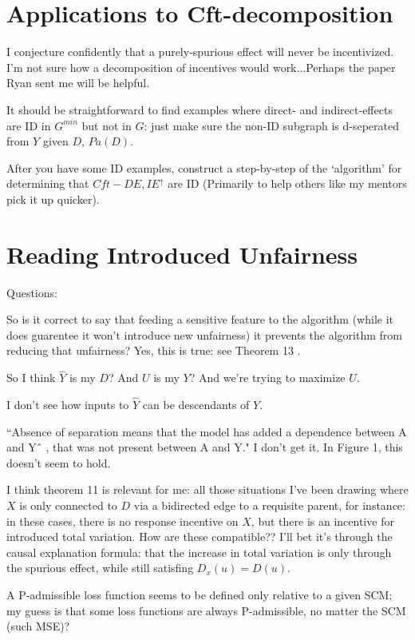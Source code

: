 \documentclass[letterpaper,10pt]{article}
\begin{document}
\section{Applications to Cft-decomposition}
I conjecture confidently that a purely-spurious effect will never be incentivized.
I'm not sure how a decomposition of incentives would work...Perhaps the paper Ryan sent me will be helpful.

It should be straightforward to find examples where direct- and indirect-effects are ID in $G^{min}$ but not in $G$: just make sure the non-ID subgraph is d-seperated from $Y$ given $D$, $Pa(D)$.

After you have some ID examples, construct a step-by-step of the `algorithm' for determining that $Cft-DE,IE^{\uparrow}$ are ID (Primarily to help others like my mentors pick it up quicker).


\section{Reading Introduced Unfairness}
Questions:

So is it correct to say that feeding a sensitive feature to the algorithm (while it does guarentee it won't introduce new unfairness) it prevents the algorithm from reducing that unfairness? 
\color{blue} Yes, this is true: see Theorem 13 \color{black}.

So I think $\hat{Y}$ is my $D$? And $U$ is my $Y$? And we're trying to maximize $U$.

I don't see how inputs to $\hat{Y}$ can be descendants of $Y$.

``Absence of separation means that the model has added a dependence between A and Yˆ , that was not present between A and Y." I don't get it. In Figure 1, this doesn't seem to hold.

I think theorem 11 is relevant for me: all those situations I've been drawing where $X$ is only connected to $D$ via a bidirected edge to a requisite parent, for instance: in these cases, there is no response incentive on $X$, but there is an incentive for introduced total variation.
How are these compatible?? 
I'll bet it's through the causal explanation formula: that the increase in total variation is only through the spurious effect, while still satisfing $D_x(u)=D(u)$.

A P-admissible loss function seems to be defined only relative to a given SCM; my guess is that some loss functions are always P-admissible, no matter the SCM (such MSE)?
\end{document}

